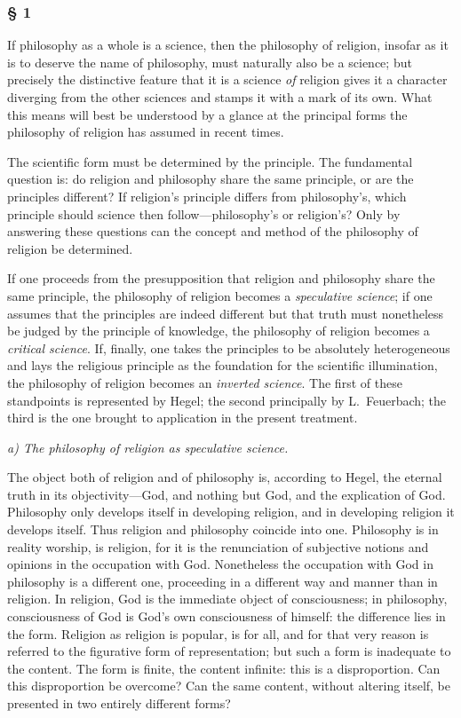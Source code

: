 \documentclass[12pt,a4paper]{article}
\begin{document}
\subsubsection*{§ 1}

If philosophy as a whole is a science, then the philosophy of
religion, insofar as it is to deserve the name of philosophy,
must naturally also be a science; but precisely the distinctive
feature that it is a science \emph{of} religion gives it a
character diverging from the other sciences and stamps it with a
mark of its own. What this means will best be understood by a
glance at the principal forms the philosophy of religion has
assumed in recent times.

The scientific form must be determined by the principle. The
fundamental question is: do religion and philosophy share the
same principle, or are the principles different? If religion's
principle differs from philosophy's, which principle should
science then follow---philosophy's or religion's? Only by
answering these questions can the concept and method of the
philosophy of religion be determined.

If one proceeds from the presupposition that religion and
philosophy share the same principle, the philosophy of religion
becomes a \emph{speculative science}; if one assumes that the
principles are indeed different but that truth must nonetheless
be judged by the principle of knowledge, the philosophy of
religion becomes a \emph{critical science}. If, finally, one
takes the principles to be absolutely heterogeneous and lays the
religious principle as the foundation for the scientific
illumination, the philosophy of religion becomes an
\emph{inverted science}. The first of these standpoints is
represented by Hegel; the second principally by L.\ Feuerbach;
the third is the one brought to application in the present
treatment.

\medskip
\noindent\textit{a) The philosophy of religion as speculative science.}
\medskip

The object both of religion and of philosophy is, according to
Hegel, the eternal truth in its objectivity---God, and nothing
but God, and the explication of God. Philosophy only develops
itself in developing religion, and in developing religion it
develops itself. Thus religion and philosophy coincide into one.
Philosophy is in reality worship, is religion, for it is the
renunciation of subjective notions and opinions in the
occupation with God. Nonetheless the occupation with God in
philosophy is a different one, proceeding in a different way and
manner than in religion. In religion, God is the immediate
object of consciousness; in philosophy, consciousness of God is
God's own consciousness of himself: the difference lies in the
form. Religion as religion is popular, is for all, and for that
very reason is referred to the figurative form of
representation; but such a form is inadequate to the content.
The form is finite, the content infinite: this is a
disproportion. Can this disproportion be overcome? Can the same
content, without altering itself, be presented in two entirely
different forms?
\end{document}
